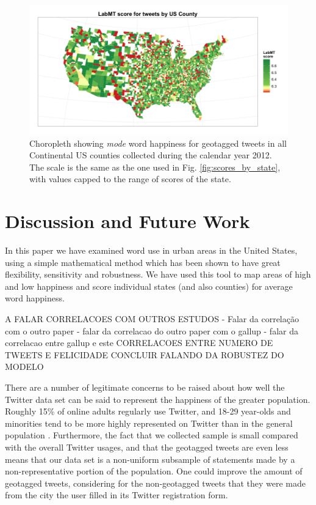 \documentclass{llncs}
\begin{document}
\begin{figure}[!ht]
\centering
\includegraphics[width=\textwidth]{images/scores_by_county}
\caption{Choropleth showing \emph{mode} word happiness for geotagged tweets in all Continental US counties collected during the calendar year 2012. The scale is the same as the one used in Fig. \ref{fig:scores_by_state}, with values capped to the range of scores of the state.}
\label{fig:scores_by_county}
\end{figure}

\section{Discussion and Future Work}
In this paper we have examined word use in urban areas in the United States, using a simple mathematical method which has been shown to have great flexibility, sensitivity and robustness. We have used this tool to map areas of high and low happiness and score individual states (and also counties) for average word happiness.

A FALAR
CORRELACOES COM OUTROS ESTUDOS
- Falar da correlação com o outro paper
- falar da correlacao do outro paper com o gallup
- falar da correlacao entre gallup e este
CORRELACOES ENTRE NUMERO DE TWEETS E FELICIDADE
CONCLUIR FALANDO DA ROBUSTEZ DO MODELO


There are a number of legitimate concerns to be raised about how well the Twitter data set can be said to represent the happiness of the greater population. Roughly 15\% of online adults regularly use Twitter, and 18-29 year-olds and minorities tend to be more highly represented on Twitter than in the general population \cite{Smith2012}. Furthermore, the fact that we collected sample is small compared with the overall Twitter usages, and that the geotagged tweets are even less means that our data set is a non-uniform subsample of statements made by a non-representative portion of the population. One could improve the amount of geotagged tweets, considering for the non-geotagged tweets that they were made from the city the user filled in its Twitter registration form.
\end{document}
